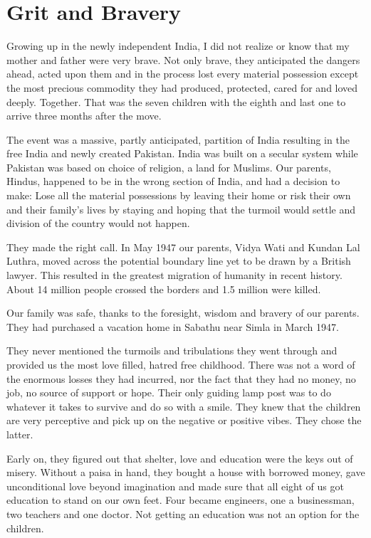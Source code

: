\chapter{Grit and Bravery}
Growing up in the newly independent India, I did not realize or know that
my mother and father were very brave. Not only brave, they anticipated the
dangers ahead, acted upon them and in the process lost every material
possession except the most precious commodity they had produced,
protected, cared for and loved deeply. Together. That was the seven
children with the eighth and last one to arrive three months after the
move. 

The event was a massive, partly anticipated, partition of India resulting
in the free India and newly created Pakistan. India was built on a secular
system while Pakistan was based on choice of religion, a land for Muslims.
Our parents, Hindus, happened to be in the wrong section of India, and had
a decision to make: Lose all the material possessions by leaving their
home or risk their own and their family's lives by staying and hoping that
the turmoil would settle and division of the country would not happen. 

They made the right call. In May 1947 our parents, Vidya Wati and Kundan
Lal Luthra, moved across the potential boundary line yet to be drawn by
a British lawyer. This resulted in the greatest migration of humanity in
recent history. About 14 million people crossed the borders and 1.5
million were killed. 

Our family was safe, thanks to the foresight, wisdom and bravery of our
parents. They had purchased a vacation home in Sabathu near Simla in March
1947. 

They never mentioned the turmoils and tribulations they went through and
provided us the most love filled, hatred free childhood. There was not
a word of the enormous losses they had incurred, nor the fact that they
had no money, no job, no source of support or hope. Their only guiding
lamp post was to do whatever it takes to survive and do so with a smile.
They knew that the children are very perceptive and pick up on the
negative or positive vibes. They chose the latter. 

Early on, they figured out that shelter, love and education were the keys
out of misery. Without a paisa in hand, they bought a house with borrowed
money, gave unconditional love beyond imagination and made sure that all
eight of us got education to stand on our own feet. Four became engineers,
one a businessman, two teachers and one doctor. Not getting an education
was not an option for the children. 

